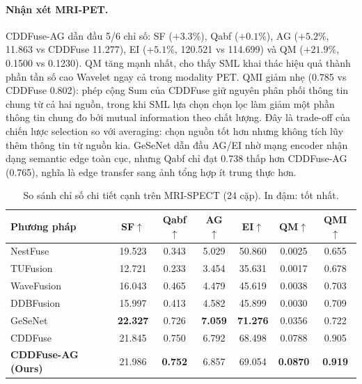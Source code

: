 \paragraph{Nhận xét MRI-PET.}
CDDFuse-AG dẫn đầu 5/6 chỉ số: SF ($+3.3\%$), Qabf ($+0.1\%$), AG ($+5.2\%$, 11.863 vs CDDFuse 11.277), EI ($+5.1\%$, 120.521 vs 114.699) và QM ($+21.9\%$, 0.1500 vs 0.1230). QM tăng mạnh nhất, cho thấy SML khai thác hiệu quả thành phần tần số cao Wavelet ngay cả trong modality PET. QMI giảm nhẹ (0.785 vs CDDFuse 0.802): phép cộng Sum của CDDFuse giữ nguyên phân phối thông tin chung từ cả hai nguồn, trong khi SML lựa chọn chọn lọc làm giảm một phần thông tin chung đo bởi mutual information theo chất lượng. Đây là trade-off của chiến lược selection so với averaging: chọn nguồn tốt hơn nhưng không tích lũy thêm thông tin từ nguồn kia. GeSeNet dẫn đầu AG/EI nhờ mạng encoder nhận dạng semantic edge toàn cục, nhưng Qabf chỉ đạt 0.738 thấp hơn CDDFuse-AG (0.765), nghĩa là edge transfer sang ảnh tổng hợp ít trung thực hơn.

\begin{table}[H]
\centering\small
\caption[Chỉ số chi tiết cạnh trên MRI-SPECT (24 cặp)]{So sánh chỉ số chi tiết cạnh trên MRI-SPECT (24 cặp). In đậm: tốt nhất.}
\label{tab:best6-spect}
\setlength{\tabcolsep}{4.5pt}
\begin{tabular}{lcccccc}
\toprule
\textbf{Phương pháp} & \textbf{SF}$\uparrow$ & \textbf{Qabf}$\uparrow$ & \textbf{AG}$\uparrow$ & \textbf{EI}$\uparrow$ & \textbf{QM}$\uparrow$ & \textbf{QMI}$\uparrow$ \\
\midrule
  NestFuse~\cite{li2020nestfuse}   & 19.523 & 0.343 & 5.029 & 50.860 & 0.0025 & 0.655 \\
  TUFusion~\cite{zhao2024tufusion} & 12.721 & 0.233 & 3.454 & 35.631 & 0.0017 & 0.678 \\
  WaveFusion~\cite{wang2025wavefusion} & 16.043 & 0.465 & 4.479 & 45.619 & 0.0038 & 0.703 \\
  DDBFusion~\cite{zhang2025ddbfusion}  & 15.997 & 0.413 & 4.582 & 45.899 & 0.0030 & 0.709 \\
  GeSeNet~\cite{li2023gesenet}    & \textbf{22.327} & 0.726 & \textbf{7.059} & \textbf{71.276} & 0.0356 & 0.722 \\
  CDDFuse~\cite{zhao2023cddfuse}  & 21.845 & 0.750 & 6.792 & 68.498 & 0.0788 & 0.905 \\
  \midrule
  \textbf{CDDFuse-AG (Ours)} & 21.986 & \textbf{0.752} & 6.857 & 69.054 & \textbf{0.0870} & \textbf{0.919} \\
\bottomrule
\end{tabular}
\end{table}

